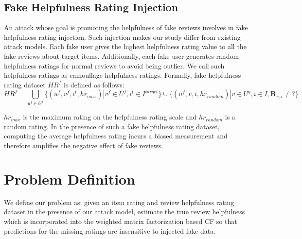 \documentclass[master,english,final]{kaist-ucs}
\begin{document}
\subsection{Fake Helpfulness Rating Injection}
An attack whose goal is promoting the helpfulness of fake reviews involves in fake helpfulness rating injection. Such injection makes our study differ from existing attack models. Each fake user gives the highest helpfulness rating value to all the fake reviews about target items. Additionally, each fake user generates random helpfulness ratings for normal reviews to avoid being outlier. We call such helpfulness ratings as camouflage helpfulness ratings.
Formally, fake helpfulness rating dataset $HR^f$ is defined as follows:
\begin{equation}
HR^f = \bigcup_{u^f \in U^f} \{(u^f,v^f, i^t,hr_{max}) | v^f \in U^f,i^t \in I^{target} \} \cup \{(u^f,v,i,hr_{random}) | v \in U^g, i \in I, \bm{R}_{v,i} \neq ? \}
\end{equation}

$hr_{max}$  is the maximum rating on the helpfulness rating scale and $hr_{random}$ is a random rating.
In the presence of such a fake helpfulness rating dataset, computing the average helpfulness rating incurs a biased measurement and therefore amplifies the negative effect of fake reviews.

\section{Problem Definition}
We define our problem as: given an item rating and review helpfulness rating dataset in the presence of our attack model, estimate the true review helpfulness which is incorporated into the weighted matrix factorization based CF so that predictions for the missing ratings are insensitive to injected fake data.
\end{document}
